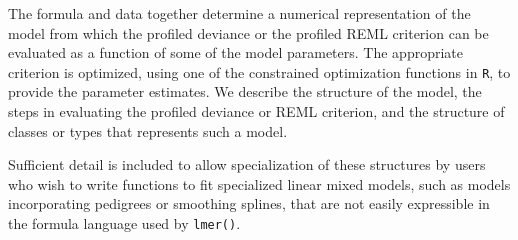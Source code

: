 \documentclass[12pt, a4paper]{report}
\theoremstyle{plain}
\theoremstyle{definition}
\theoremstyle{remark}
\begin{document}
The formula and data together determine a numerical representation of the model from which the profiled deviance or the profiled REML criterion can be evaluated as a function of some of the model parameters. The appropriate criterion is optimized, using one of the constrained optimization functions in \texttt{R}, to provide the parameter estimates. We describe the structure of the model, the steps in evaluating the profiled deviance or REML criterion, and the structure of classes or types that represents such a model. 

Sufficient detail is included to allow specialization of these structures by users who wish to write functions to fit specialized linear mixed models, such as models incorporating pedigrees or smoothing splines, that are not easily expressible in the formula language used by \texttt{lmer()}.
\end{document}
